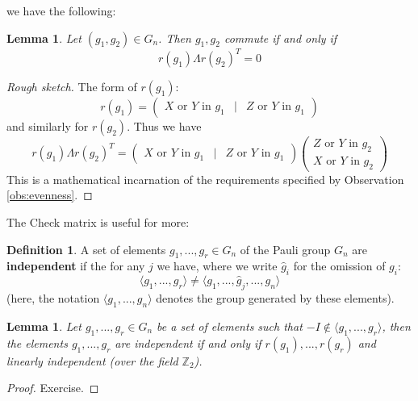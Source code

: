 \documentclass[12pt]{article}
\theoremstyle{plain}
\newtheorem{lemma}[thm]{Lemma}
\theoremstyle{definition}
\newtheorem{defn}[thm]{Definition} %
\newcommand{\bb}[1]{\mathbb{#1}}
\begin{document}
	we have the following:
	\begin{lemma}
		Let $(g_1,g_2) \in G_n$. Then $g_1,g_2$ commute if and only if
		\begin{equation}
			r(g_1) \Lambda r(g_2)^T = 0
		\end{equation}
	\end{lemma}
	\begin{proof}[Rough sketch]
		The form of $r(g_1)$:
		\begin{equation}
			r(g_1) =
			\begin{pmatrix}
				X \text{ or } Y \text{ in }g_1 & | & Z \text{ or } Y\text{ in }g_1
			\end{pmatrix}
		\end{equation}
		and similarly for $r(g_2)$. Thus we have
		\begin{equation}
			r(g_1) \Lambda r(g_2)^T = \begin{pmatrix}
				X \text{ or } Y \text{ in }g_1 & | & Z \text{ or } Y\text{ in }g_1
			\end{pmatrix}
			\begin{pmatrix}
				Z \text{ or } Y \text{ in }g_2\\
				X \text{ or } Y \text{ in }g_2
			\end{pmatrix}
		\end{equation}
		This is a mathematical incarnation of the requirements specified by Observation \ref{obs:evenness}.
	\end{proof}
	The Check matrix is useful for more:
	\begin{defn}
		A set of elements $g_1,...,g_r \in G_n$ of the Pauli group $G_n$ are \textbf{independent} if the for any $j$ we have, where we write $\hat{g}_i$ for the omission of $g_i$:
		\begin{equation}
			\langle g_1,...,g_r \rangle \neq \langle g_1,...,\hat{g}_j, ..., g_n\rangle
		\end{equation}
		(here, the notation $\langle g_1,...,g_n\rangle$ denotes the group generated by these elements).
	\end{defn}
	\begin{lemma}\label{lem:lin_indep}
		Let $g_1,...,g_r \in G_n$ be a set of elements such that $-I \not\in \langle g_1,...,g_r\rangle$, then the elements $g_1,...,g_r$ are independent if and only if $r(g_1),...,r(g_r)$ and linearly independent (over the field $\bb{Z}_2$).
	\end{lemma}
	\begin{proof}
		Exercise.
	\end{proof}
\end{document}
